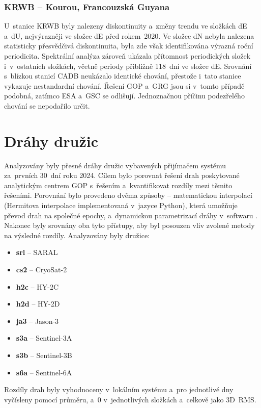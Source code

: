 \subsubsection{KRWB -- Kourou, Francouzská Guyana}

U~stanice KRWB byly nalezeny diskontinuity a~změny trendu ve složkách dE a~dU, nejvýrazněji ve složce dE před rokem~2020. Ve složce dN nebyla nalezena statisticky přesvědčivá diskontinuita, byla zde však identifikována výrazná roční periodicita. Spektrální analýza zároveň ukázala přítomnost periodických složek i~v~ostatních složkách, včetně periody přibližně 118~dní ve složce dE. Srovnání s~blízkou stanicí CADB neukázalo identické chování, přestože i~tato stanice vykazuje nestandardní chování. Řešení GOP a~GRG jsou si v~tomto případě podobná, zatímco ESA a~GSC se odlišují. Jednoznačnou příčinu podezřelého chování se nepodařilo určit.

\clearpage
\section{Dráhy družic}
\label{sec:vysledky-drahy}

Analyzovány byly přesné dráhy družic vybavených přijímačem systému  za~prvních 30~dní roku 2024. Cílem bylo porovnat řešení drah poskytované analytickým centrem GOP s~řešením  a~kvantifikovat rozdíly mezi těmito řešeními. Porovnání bylo provedeno dvěma způsoby -- matematickou interpolací (Hermitova interpolace implementovaná v~jazyce Python), která umožňuje převod drah na společné epochy, a~dynamickou parametrizací dráhy v~softwaru . Nakonec byly srovnány oba tyto přístupy, aby byl posouzen vliv zvolené metody na výsledné rozdíly. Analyzovány byly družice:


\begin{itemize}
\item \textbf{srl} -- SARAL
\item \textbf{cs2} -- CryoSat-2
\item \textbf{h2c} -- HY-2C
\item \textbf{h2d} -- HY-2D
\item \textbf{ja3} -- Jason-3
\item \textbf{s3a} -- Sentinel-3A
\item \textbf{s3b} -- Sentinel-3B
\item \textbf{s6a} -- Sentinel-6A
\end{itemize}

Rozdíly drah byly vyhodnoceny v~lokálním systému  a~pro jednotlivé dny vyčísleny pomocí průměru,  a~0 v~jednotlivých složkách  a~celkově jako 3D~RMS.
